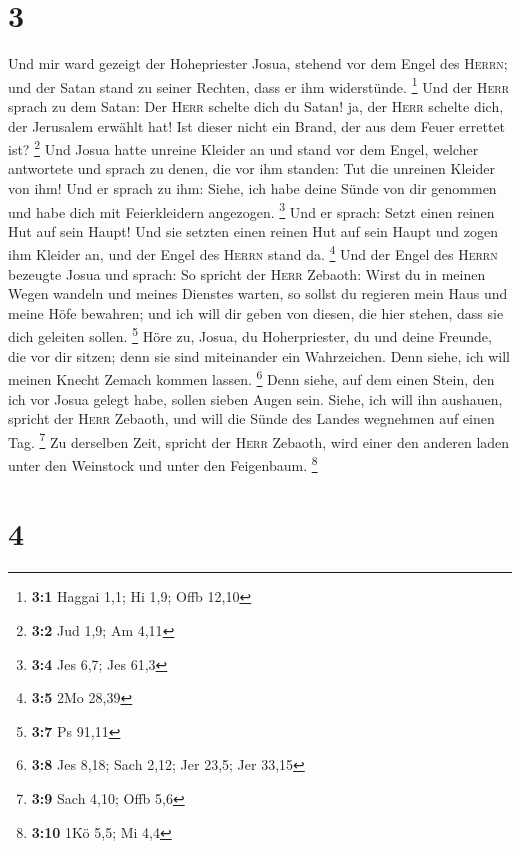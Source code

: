 \hypertarget{section-2}{%
\section{3}\label{section-2}}

 Und mir ward gezeigt der Hohepriester Josua, stehend vor
dem Engel des \textsc{Herrn}; und der Satan stand zu seiner Rechten,
dass er ihm widerstünde. \footnote{\textbf{3:1} Haggai 1,1; Hi 1,9; Offb
  12,10}  Und der \textsc{Herr} sprach zu dem Satan: Der
\textsc{Herr} schelte dich du Satan! ja, der \textsc{Herr} schelte dich,
der Jerusalem erwählt hat! Ist dieser nicht ein Brand, der aus dem Feuer
errettet ist? \footnote{\textbf{3:2} Jud 1,9; Am 4,11} 
Und Josua hatte unreine Kleider an und stand vor dem Engel,
 welcher antwortete und sprach zu denen, die vor ihm
standen: Tut die unreinen Kleider von ihm! Und er sprach zu ihm: Siehe,
ich habe deine Sünde von dir genommen und habe dich mit Feierkleidern
angezogen. \footnote{\textbf{3:4} Jes 6,7; Jes 61,3}  Und
er sprach: Setzt einen reinen Hut auf sein Haupt! Und sie setzten einen
reinen Hut auf sein Haupt und zogen ihm Kleider an, und der Engel des
\textsc{Herrn} stand da. \footnote{\textbf{3:5} 2Mo 28,39}
 Und der Engel des \textsc{Herrn} bezeugte Josua und
sprach:  So spricht der \textsc{Herr} Zebaoth: Wirst du in
meinen Wegen wandeln und meines Dienstes warten, so sollst du regieren
mein Haus und meine Höfe bewahren; und ich will dir geben von diesen,
die hier stehen, dass sie dich geleiten sollen. \footnote{\textbf{3:7}
  Ps 91,11}  Höre zu, Josua, du Hoherpriester, du und
deine Freunde, die vor dir sitzen; denn sie sind miteinander ein
Wahrzeichen. Denn siehe, ich will meinen Knecht Zemach kommen lassen.
\footnote{\textbf{3:8} Jes 8,18; Sach 2,12; Jer 23,5; Jer 33,15}
 Denn siehe, auf dem einen Stein, den ich vor Josua gelegt
habe, sollen sieben Augen sein. Siehe, ich will ihn aushauen, spricht
der \textsc{Herr} Zebaoth, und will die Sünde des Landes wegnehmen auf
einen Tag. \footnote{\textbf{3:9} Sach 4,10; Offb 5,6} 
Zu derselben Zeit, spricht der \textsc{Herr} Zebaoth, wird einer den
anderen laden unter den Weinstock und unter den Feigenbaum. \footnote{\textbf{3:10}
  1Kö 5,5; Mi 4,4}

\hypertarget{section-3}{%
\section{4}\label{section-3}}

